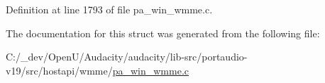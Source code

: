 Definition at line 1793 of file pa\+\_\+win\+\_\+wmme.\+c.



The documentation for this struct was generated from the following file\+:\begin{DoxyCompactItemize}
\item 
C\+:/\+\_\+dev/\+Open\+U/\+Audacity/audacity/lib-\/src/portaudio-\/v19/src/hostapi/wmme/\hyperlink{pa__win__wmme_8c}{pa\+\_\+win\+\_\+wmme.\+c}\end{DoxyCompactItemize}
